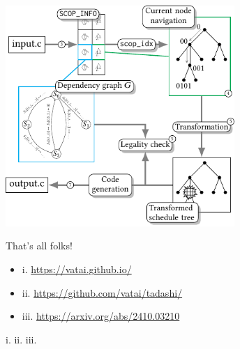\documentclass[presentation, aspectratio=169]{beamer}
\begin{document}
\begin{frame}[label={sec:orgd726f4c}]{}
\begin{center}
\includegraphics[width=0.65\textwidth]{./figs/design.pdf}
\end{center}
\end{frame}
\begin{frame}[label={sec:org06b8dce}]{That's all folks!}
\begin{itemize}
\item i. \url{https://vatai.github.io/}
\item ii. \url{https://github.com/vatai/tadashi/}
\item iii. \url{https://arxiv.org/abs/2410.03210}
\end{itemize}

\bigskip

i.  \hfill
ii.  \hfill
iii. 
\end{frame}
\end{document}
